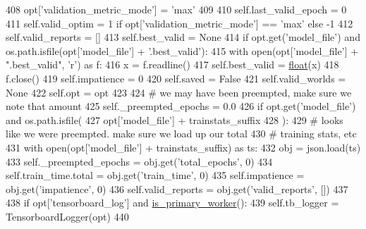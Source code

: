 \begin{DoxyCode}
408             opt[\textcolor{stringliteral}{'validation\_metric\_mode'}] = \textcolor{stringliteral}{'max'}
409 
410         self.last\_valid\_epoch = 0
411         self.valid\_optim = 1 \textcolor{keywordflow}{if} opt[\textcolor{stringliteral}{'validation\_metric\_mode'}] == \textcolor{stringliteral}{'max'} \textcolor{keywordflow}{else} -1
412         self.valid\_reports = []
413         self.best\_valid = \textcolor{keywordtype}{None}
414         \textcolor{keywordflow}{if} opt.get(\textcolor{stringliteral}{'model\_file'}) \textcolor{keywordflow}{and} os.path.isfile(opt[\textcolor{stringliteral}{'model\_file'}] + \textcolor{stringliteral}{'.best\_valid'}):
415             with open(opt[\textcolor{stringliteral}{'model\_file'}] + \textcolor{stringliteral}{".best\_valid"}, \textcolor{stringliteral}{'r') as f:}
416 \textcolor{stringliteral}{                x = f.readline()}
417 \textcolor{stringliteral}{                self.best\_valid = \hyperlink{namespaceprojects_1_1controllable__dialogue_1_1make__control__dataset_aa2b7207688c641dbc094ab44eca27113}{float}(x)}
418 \textcolor{stringliteral}{                f.close()}
419 \textcolor{stringliteral}{        self.impatience = 0}
420 \textcolor{stringliteral}{        self.saved = }\textcolor{keyword}{False}
421         self.valid\_worlds = \textcolor{keywordtype}{None}
422         self.opt = opt
423 
424         \textcolor{comment}{# we may have been preempted, make sure we note that amount}
425         self.\_preempted\_epochs = 0.0
426         \textcolor{keywordflow}{if} opt.get(\textcolor{stringliteral}{'model\_file'}) \textcolor{keywordflow}{and} os.path.isfile(
427             opt[\textcolor{stringliteral}{'model\_file'}] + trainstats\_suffix
428         ):
429             \textcolor{comment}{# looks like we were preempted. make sure we load up our total}
430             \textcolor{comment}{# training stats, etc}
431             with open(opt[\textcolor{stringliteral}{'model\_file'}] + trainstats\_suffix) \textcolor{keyword}{as} ts:
432                 obj = json.load(ts)
433                 self.\_preempted\_epochs = obj.get(\textcolor{stringliteral}{'total\_epochs'}, 0)
434                 self.train\_time.total = obj.get(\textcolor{stringliteral}{'train\_time'}, 0)
435                 self.impatience = obj.get(\textcolor{stringliteral}{'impatience'}, 0)
436                 self.valid\_reports = obj.get(\textcolor{stringliteral}{'valid\_reports'}, [])
437 
438         \textcolor{keywordflow}{if} opt[\textcolor{stringliteral}{'tensorboard\_log'}] \textcolor{keywordflow}{and} \hyperlink{namespaceparlai_1_1utils_1_1distributed_a9bb1dac198180590ef8c6b6c6f9fc2c4}{is\_primary\_worker}():
439             self.tb\_logger = TensorboardLogger(opt)
440 
\end{DoxyCode}



